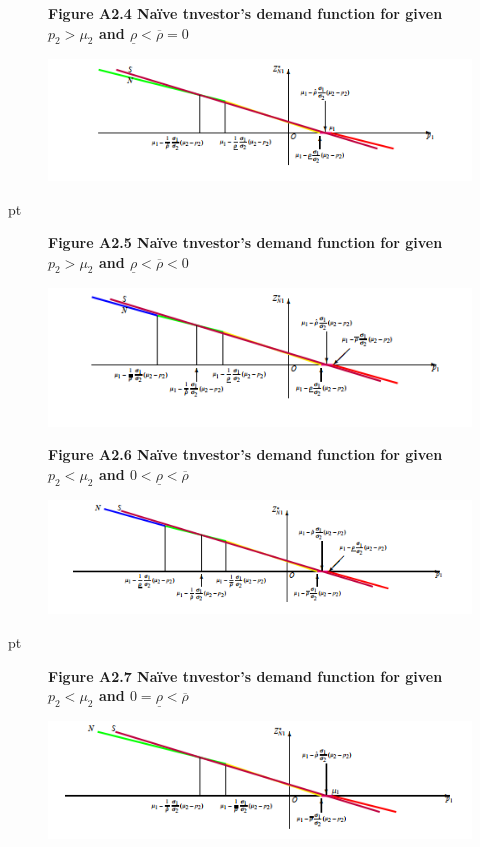 \documentclass[10.0pt]{article}
\begin{document}
\begin{figure}
\centerline{\bf Figure A2.4 \quad Na\"ive tnvestor's demand function for given $ p_2 > \mu_2 $ and $ \underline{\rho} < \overline{\rho} = 0 $}
	\centering
	\includegraphics[width=1.0 \textwidth]{FigureA2.4.png}
\end{figure}




 pt


\begin{figure}
\centerline{\bf Figure A2.5 \quad Na\"ive tnvestor's demand function for given $ p_2 > \mu_2 $ and $ \underline{\rho} < \overline{\rho} < 0 $}
	\centering
	\includegraphics[width=1.0 \textwidth]{FigureA2.5.png}
\end{figure}

\newpage



\begin{figure}
\centerline{\bf Figure A2.6 \quad Na\"ive tnvestor's demand function for given $ p_2 < \mu_2 $ and $ 0 < \underline{\rho} < \overline{\rho} $}
	\centering
	\includegraphics[width=1.0 \textwidth]{FigureA2.6.png}
\end{figure}


 pt


\begin{figure}
\centerline{\bf Figure A2.7 \quad Na\"ive tnvestor's demand function for given $ p_2 < \mu_2 $ and $ 0 = \underline{\rho} < \overline{\rho} $}
	\centering
	\includegraphics[width=1.0 \textwidth]{FigureA2.7.png}
\end{figure}
\end{document}
